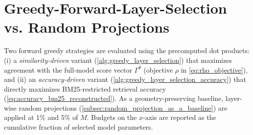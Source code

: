 \section{Greedy-Forward-Layer-Selection vs. Random Projections}\label{sec:greedy_vs_rp}
Two forward greedy strategies are evaluated using the precomputed dot products: (i) a \emph{similarity-driven} variant (\autoref{alg:greedy_layer_selection}) that maximizes agreement with the full-model score vector $\Gamma^\theta$ (objective $\rho$ in \autoref{eq:rho_objective}), and (ii) an \emph{accuracy-driven} variant (\autoref{alg:greedy_layer_selection_accuracy}) that directly maximizes BM25-restricted retrieval accuracy (\autoref{eq:accuracy_bm25_reconstructed}). As a geometry-preserving baseline, layer-wise random projections (\autoref{subsec:random_projection_as_a_baseline}) are applied at 1\% and 5\% of $M$. Budgets on the $x$-axis are reported as the cumulative fraction of selected model parameters.

